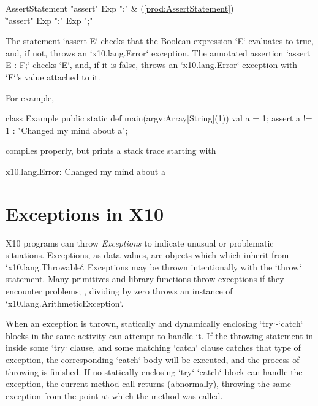 \begin{bbgrammar}
     AssertStatement \: \xcd"assert" Exp \xcd";" & (\ref{prod:AssertStatement}) \\
                    \| \xcd"assert" Exp  \xcd":" Exp  \xcd";" \\
\end{bbgrammar}

The statement \xcd`assert E` checks that the Boolean expression \xcd`E`
evaluates to true, and, if not, throws an \xcd`x10.lang.Error`  exception.  
The annotated assertion \xcd`assert E : F;` checks \xcd`E`, and, if it is
false, throws an \xcd`x10.lang.Error` exception with \xcd`F`'s value attached
to it. 

For example, 
% 
\begin{xten}
class Example {
  public static def main(argv:Array[String](1)) {
    val a = 1;
    assert a != 1 : "Changed my mind about a";
  }
}
\end{xten}
\noindent
compiles properly, but prints a stack trace starting with 
\begin{xten}
x10.lang.Error: Changed my mind about a
\end{xten}


\section{Exceptions in X10}

X10 programs can throw {\em Exceptions} to indicate unusual or problematic
situations.  Exceptions, as data values, are objects which which inherit from
\xcd`x10.lang.Throwable`.    Exceptions may be thrown intentionally with the
\xcd`throw` statement. Many primitives and library functions throw exceptions
if they encounter problems; \eg, dividing by zero throws an instance of
\xcd`x10.lang.ArithmeticException`. 

When an exception is thrown, statically and dynamically enclosing
\xcd`try`-\xcd`catch` blocks in the same activity can attempt to handle it.   If the throwing
statement in inside some \xcd`try` clause, and some matching \xcd`catch`
clause catches that type of exception, the corresponding \xcd`catch` body will
be executed, and the process of throwing is finished.  
If no statically-enclosing \xcd`try`-\xcd`catch` block can handle the
exception, the current method call returns (abnormally), throwing the same
exception from the point at which the method was called.  

